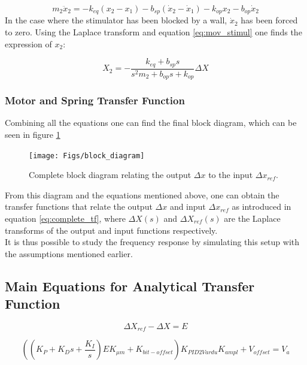 \begin{equation}
	m_2 \ddot{x}_2 = -k_{eq} (x_2 - x_1) - b_{sp} (\dot{x}_2 - \dot{x}_1) - k_{op} x_2 - b_{op} \dot{x}_2
	\label{eq:mov_stimul}
\end{equation}
In the case where the stimulator has been blocked by a wall, $\dot{x}_2$ has been forced to zero. Using the Laplace transform and equation \ref{eq:mov_stimul} one finds the expression of $x_2$:
	
\begin{equation}
	X_2 = -\frac{k_{eq} + b_{sp} s}{s^2 m_2 + b_{op} s + k_{op}} \Delta X
	\label{eq:x2dx}
\end{equation}
	
\subsubsection{Motor and Spring Transfer Function}
Combining all the equations one can find the final block diagram, which can be seen in figure \ref{fig:block_diagram}
\begin{figure}[h!]
	\centering
	\texttt{[image: Figs/block\_diagram]}
	\caption{Complete block diagram relating the output $\Delta x$ to the input $\Delta x_{ref}$.}
	\label{fig:block_diagram}
\end{figure}


From this diagram and the equations mentioned above, one can obtain the transfer functions that relate the output $\Delta x$ and input $\Delta x_{ref}$ as introduced in equation \ref{eq:complete_tf}, where $\Delta X(s)$ and $\Delta X_{ref}(s)$ are the Laplace transforms of the output and input functions respectively. \\
It is thus possible to study the frequency response by simulating this setup with the assumptions mentioned earlier.
	
\subsection{Main Equations for Analytical Transfer Function}
\begin{equation}
	\Delta X_{ref} - \Delta X = E
	\label{eq:error}
\end{equation}
	
\begin{equation}
	((K_P + K_D s + \frac{K_I}{s})E K_{\mu m} + K_{bit-offset}) K_{PID2Vardu} K_{ampl} + V_{offset}= V_a
	\label{eq:PID}
\end{equation}
	
